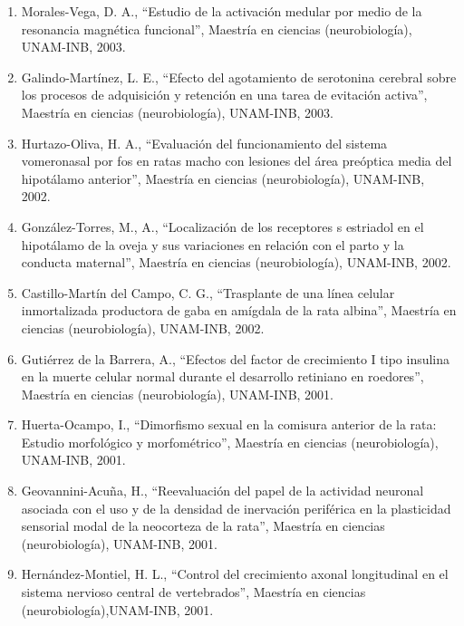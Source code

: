 \begin{enumerate}
\item Morales-Vega, D. A., “Estudio de la activación medular por medio de la resonancia magnética funcional”, Maestría en ciencias (neurobiología), 
UNAM-INB,   
2003.

\item 
Galindo-Martínez, L. E., “Efecto del agotamiento de serotonina cerebral sobre los procesos de adquisición y retención en una tarea de evitación 
activa”, 
Maestría en ciencias (neurobiología), UNAM-INB,   2003.

\item Hurtazo-Oliva, H. A., “Evaluación del funcionamiento del sistema vomeronasal por fos en ratas macho con lesiones del área preóptica media del 
hipotálamo 
anterior”, Maestría en ciencias (neurobiología), UNAM-INB,   2002.

\item González-Torres, M., A., “Localización de los receptores s estriadol en el hipotálamo de la oveja y sus variaciones en relación con el parto y la 
conducta 
maternal”, Maestría en ciencias (neurobiología), UNAM-INB,   2002.

\item Castillo-Martín del Campo, C. G., “Trasplante de una línea celular inmortalizada productora de gaba en amígdala de la rata albina”, Maestría en 
ciencias 
(neurobiología), UNAM-INB,   2002.

\item Gutiérrez de la Barrera, A., “Efectos del factor de crecimiento I tipo insulina en la muerte celular normal durante el desarrollo retiniano en 
roedores”, 
Maestría en ciencias (neurobiología), UNAM-INB,   2001.

\item Huerta-Ocampo, I., “Dimorfismo sexual en la comisura anterior de la rata: Estudio morfológico y morfométrico”, Maestría en ciencias (neurobiología), 
UNAM-INB,   2001.

\item Geovannini-Acuña, H., “Reevaluación del papel de la actividad neuronal asociada con el uso y de la densidad de inervación periférica en la plasticidad 
sensorial modal de la neocorteza de la rata”, Maestría en ciencias (neurobiología), UNAM-INB,   2001.

\item Hernández-Montiel, H. L., “Control del crecimiento axonal longitudinal en el sistema nervioso central de vertebrados”, Maestría en ciencias 
(neurobiología),UNAM-INB,   2001.


\end{enumerate}
